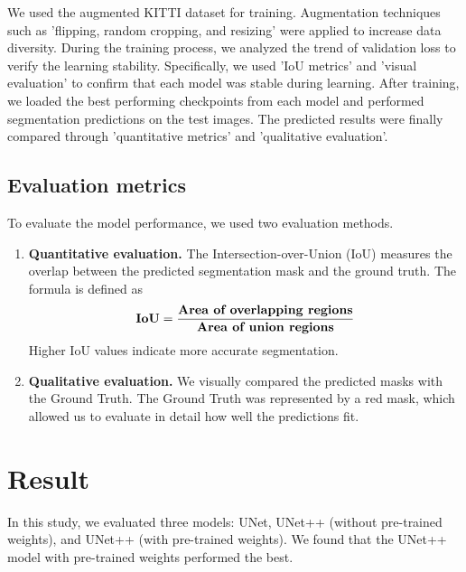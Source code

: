 \documentclass[10pt,twocolumn,letterpaper,final]{article} %
\begin{document}
We used the augmented KITTI dataset for training. Augmentation techniques such as 'flipping, random cropping, and resizing' were applied to increase data diversity.
During the training process, we analyzed the trend of validation loss to verify the learning stability. Specifically, we used 'IoU metrics' and 'visual evaluation' to confirm that each model was stable during learning. After training, we loaded the best performing checkpoints from each model and performed segmentation predictions on the test images. The predicted results were finally compared through 'quantitative metrics' and 'qualitative evaluation'.


\subsection{Evaluation metrics}
To evaluate the model performance, we used two evaluation methods.

\begin{enumerate}
    \item \textbf{Quantitative evaluation.} 
    The Intersection-over-Union (IoU) measures the overlap between the predicted segmentation mask and the ground truth. The formula is defined as
    \[
    \text{\textbf{IoU}} = \frac{\text{\textbf{Area of overlapping regions}}}{\text{\textbf{Area of union regions}}}
    \]
    Higher IoU values indicate more accurate segmentation.

    \item \textbf{Qualitative evaluation.} 
    We visually compared the predicted masks with the Ground Truth. The Ground Truth was represented by a red mask, which allowed us to evaluate in detail how well the predictions fit.
\end{enumerate}
\section{Result}
\label{sec:intro}
In this study, we evaluated three models: UNet, UNet++ (without pre-trained weights), and UNet++ (with pre-trained weights). We found that the UNet++ model with pre-trained weights performed the best.
\end{document}
